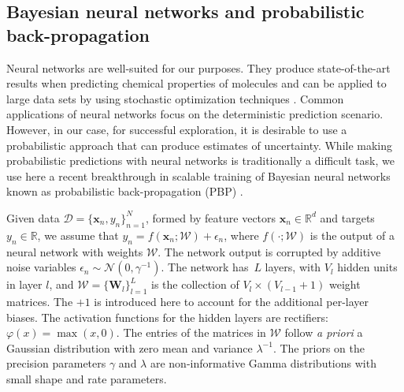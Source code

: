 \subsection{Bayesian neural networks and probabilistic back-propagation}

Neural networks are well-suited for our purposes. They produce state-of-the-art results when predicting chemical properties of molecules \cite{Ma_2015,Mayr_2016,ramsundar2015massively} and can be applied to large data sets by using stochastic optimization techniques \cite{bousquet2008tradeoffs}. Common applications of neural networks focus on the deterministic prediction scenario. However, in our case, for successful exploration, it is desirable to use a probabilistic approach that can produce estimates of uncertainty. While making probabilistic predictions with neural networks is traditionally a difficult task, we use here a recent breakthrough in scalable training of Bayesian neural networks known as probabilistic back-propagation (PBP) \cite{hernandez2015probabilistic}. 

Given data ${\mathcal{D} = \{\mathbf{x}_n, y_n \}_{n=1}^N}$, formed by feature vectors $\mathbf{x}_n \in \mathbb{R}^d$ and targets ${y_n \in \mathbb{R}}$, we assume that $y_n = f(\mathbf{x}_n;\mathcal{W}) + \epsilon_n$, where $f(\cdot ;\mathcal{W})$ is the output of a neural network with weights $\mathcal{W}$. The network output is corrupted by additive noise variables $\epsilon_n \sim \mathcal{N}(0,\gamma^{-1})$. The network has~$L$ layers, with $V_l$ hidden units in layer $l$, and $\mathcal{W} = \{ \mathbf{W}_l \}_{l=1}^L$ is the collection of $V_l \times (V_{l-1}+1)$ weight matrices. The $+1$ is introduced here to account for the additional per-layer biases. The activation functions for the hidden layers are rectifiers: $\varphi(x) = \max(x,0)$. The entries of the matrices in $\mathcal{W}$ follow \emph{a priori} a Gaussian distribution with zero mean and variance $\lambda^{-1}$. The priors on the precision parameters $\gamma$ and $\lambda$ are non-informative Gamma distributions with small shape and rate parameters.

